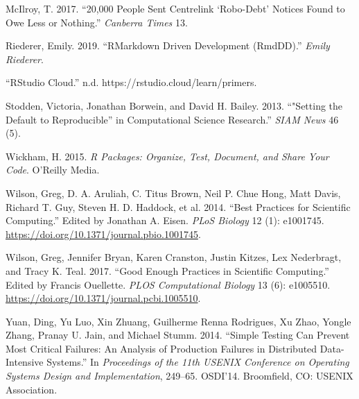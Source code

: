 \documentclass[
]{article}
\newlength{\cslhangindent}
\newenvironment{cslreferences}%
  {\setlength{\parindent}{0pt}%
  \everypar{\setlength{\hangindent}{\cslhangindent}}\ignorespaces}%
  {\par}
\begin{document}
\begin{cslreferences}
\leavevmode\hypertarget{ref-mcilroy201720}{}%
McIlroy, T. 2017. ``20,000 People Sent Centrelink `Robo-Debt' Notices
Found to Owe Less or Nothing.'' \emph{Canberra Times} 13.

\leavevmode\hypertarget{ref-riederer_rmarkdowndrivendevelopment_2019}{}%
Riederer, Emily. 2019. ``RMarkdown Driven Development (RmdDD).''
\emph{Emily Riederer}.

\leavevmode\hypertarget{ref-_rstudiocloud_}{}%
``RStudio Cloud.'' n.d. https://rstudio.cloud/learn/primers.

\leavevmode\hypertarget{ref-stodden_setting_2013}{}%
Stodden, Victoria, Jonathan Borwein, and David H. Bailey. 2013.
``"Setting the Default to Reproducible'' in Computational Science
Research.'' \emph{SIAM News} 46 (5).

\leavevmode\hypertarget{ref-wickham_r_2015}{}%
Wickham, H. 2015. \emph{R Packages: Organize, Test, Document, and Share
Your Code}. O'Reilly Media.

\leavevmode\hypertarget{ref-wilson_best_2014}{}%
Wilson, Greg, D. A. Aruliah, C. Titus Brown, Neil P. Chue Hong, Matt
Davis, Richard T. Guy, Steven H. D. Haddock, et al. 2014. ``Best
Practices for Scientific Computing.'' Edited by Jonathan A. Eisen.
\emph{PLoS Biology} 12 (1): e1001745.
\url{https://doi.org/10.1371/journal.pbio.1001745}.

\leavevmode\hypertarget{ref-wilson_good_2017}{}%
Wilson, Greg, Jennifer Bryan, Karen Cranston, Justin Kitzes, Lex
Nederbragt, and Tracy K. Teal. 2017. ``Good Enough Practices in
Scientific Computing.'' Edited by Francis Ouellette. \emph{PLOS
Computational Biology} 13 (6): e1005510.
\url{https://doi.org/10.1371/journal.pcbi.1005510}.

\leavevmode\hypertarget{ref-yuan_simpletestingcan_2014}{}%
Yuan, Ding, Yu Luo, Xin Zhuang, Guilherme Renna Rodrigues, Xu Zhao,
Yongle Zhang, Pranay U. Jain, and Michael Stumm. 2014. ``Simple Testing
Can Prevent Most Critical Failures: An Analysis of Production Failures
in Distributed Data-Intensive Systems.'' In \emph{Proceedings of the
11th USENIX Conference on Operating Systems Design and Implementation},
249--65. OSDI'14. Broomfield, CO: USENIX Association.
\end{cslreferences}
\end{document}
